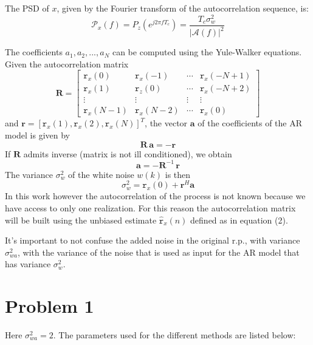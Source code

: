 \documentclass[a4paper, 12pt]{report}
\begin{document}
The PSD of $x$, given by the Fourier transform of the autocorrelation sequence, is:
\begin{equation}
	\mathcal{P}_x(f) = P_z(e^{j 2 \pi f T_c})= \frac{T_c \sigma_w^2}{|\mathcal{A}(f)|^2}
\end{equation}

The coefficients $a_1, a_2, ..., a_N$ can be computed using the Yule-Walker equations. Given the autocorrelation matrix
\begin{equation}
\mathbf{R} =
\begin{bmatrix}
\mathtt{r}_x(0)		&	\mathtt{r}_x(-1) 	& \cdots &	\mathtt{r}_x(-N+1) \\
\mathtt{r}_x(1)		&	\mathtt{r}_z(0)  	& \cdots &	\mathtt{r}_x(-N+2) \\
\vdots				&	\vdots        		& \vdots &	\vdots \\
\mathtt{r}_x(N-1)	&	\mathtt{r}_x(N-2)	& \cdots &	\mathtt{r}_x(0)
\end{bmatrix}
\end{equation}
and $ \mathbf{r} = [\mathtt{r}_x(1),  \mathtt{r}_x(2),  \mathtt{r}_x(N)]^T $, the vector $\mathbf{a}$ of the coefficients of the AR model is given by
\begin{equation}\label{eq:yulewalker}
	\mathbf{R} \, \mathbf{a} = - \mathbf{r}
\end{equation}
If $\mathbf{R}$ admits inverse (matrix is not ill conditioned), we obtain
\begin{equation}
	\mathbf{a} = -\mathbf{R}^{-1} \, \mathbf{r}
\end{equation}
The variance $\sigma_w ^2$ of the white noise $w(k)$ is then
\begin{equation}
	\sigma_w ^2 = \mathtt{r}_x(0) + \mathbf{r}^H \mathbf{a}
\end{equation}
In this work however the autocorrelation of the process is not known because we have access to only one realization. For this reason the autocorrelation matrix will be built using the unbiased estimate $\hat{\mathtt{r}}_x(n)$ defined as in equation (2).

It's important to not confuse the added noise in the original r.p., with variance $\sigma_{wa}^2$, with the variance of the noise that is used as input for the AR model that has variance $\sigma_{w}^2$.

\section*{Problem 1}
Here $\sigma_{wa}^2=2$.
The parameters used for the different methods are listed below:
\end{document}

